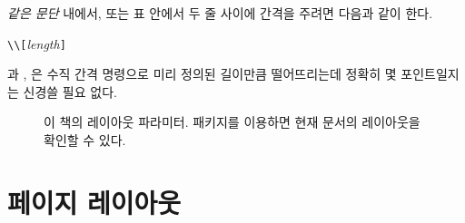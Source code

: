 \emph{같은 문단} 내에서, 또는 표 안에서 두 줄 사이에 간격을 주려면 다음과 같이 한다.
\begin{lscommand}
\verb|\\[|\emph{length}\verb|]|
\end{lscommand}

과 , 은 수직 간격 명령으로 미리 정의된 길이만큼 떨어뜨리는데 정확히 몇 포인트일지는 신경쓸 필요 없다.


\begin{figure}[p]
  \begin{center}
  \makeatletter\@mylayout\makeatother
  \end{center}
  \vspace*{1.8cm}
  \caption[이 책자의 레이아웃 파라미터]%
  {이 책의 레이아웃 파라미터.  패키지를 이용하면 현재 문서의 레이아웃을 확인할 수 있다.}
  \label{fig:layout}
  \end{figure}
  
\thispagestyle{lshortko}



\section{페이지 레이아웃}

